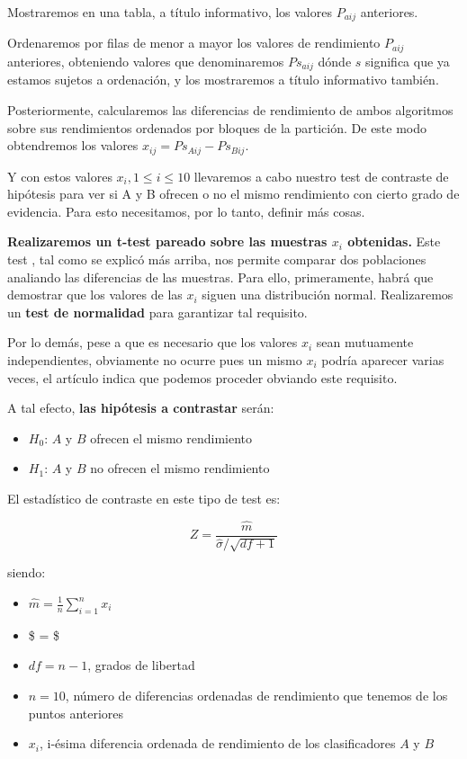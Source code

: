 \documentclass[11pt]{article}
\providecommand{\tightlist}{%
      \setlength{\itemsep}{0pt}\setlength{\parskip}{0pt}}
\begin{document}
Mostraremos en una tabla, a título informativo, los valores \(P_{aij}\)
anteriores.

Ordenaremos por filas de menor a mayor los valores de rendimiento
\(P_{aij}\) anteriores, obteniendo valores que denominaremos
\(Ps_{aij}\) dónde \(s\) significa que ya estamos sujetos a ordenación,
y los mostraremos a título informativo también.

Posteriormente, calcularemos las diferencias de rendimiento de ambos
algoritmos sobre sus rendimientos ordenados por bloques de la partición.
De este modo obtendremos los valores \(x_{ij} = Ps_{Aij} - Ps_{Bij}\).

Y con estos valores \(x_i, 1 \le i \le 10\) llevaremos a cabo nuestro
test de contraste de hipótesis para ver si A y B ofrecen o no el mismo
rendimiento con cierto grado de evidencia. Para esto necesitamos, por lo
tanto, definir más cosas.

\textbf{Realizaremos un t-test pareado sobre las muestras \(x_i\)
obtenidas. } Este test , tal como se explicó más arriba, nos permite
comparar dos poblaciones analiando las diferencias de las muestras. Para
ello, primeramente, habrá que demostrar que los valores de las \(x_i\)
siguen una distribución normal. Realizaremos un \textbf{test de
normalidad} para garantizar tal requisito.

Por lo demás, pese a que es necesario que los valores \(x_i\) sean
mutuamente independientes, obviamente no ocurre pues un mismo \(x_i\)
podría aparecer varias veces, el artículo indica que podemos proceder
obviando este requisito.

A tal efecto, \textbf{las hipótesis a contrastar} serán:

\begin{itemize}
\tightlist
\item
  \(H_0\): \(A\) y \(B\) ofrecen el mismo rendimiento
\item
  \(H_1\): \(A\) y \(B\) no ofrecen el mismo rendimiento
\end{itemize}

El estadístico de contraste en este tipo de test es:

\[ Z = \frac{\hat{m}}{\hat{\sigma} / \sqrt{df+1}} \]

siendo:

\begin{itemize}
\tightlist
\item
  \(\hat{m} = \frac{1}{n} \sum_{i=1}^{n} x_i\)
\item
  \$\hat{\sigma} = 
  \$
\item
  \(df = n-1\), grados de libertad
\item
  \(n = 10\), número de diferencias ordenadas de rendimiento que tenemos
  de los puntos anteriores
\item
  \(x_i\), i-ésima diferencia ordenada de rendimiento de los
  clasificadores \(A\) y \(B\)
\end{itemize}
\end{document}
